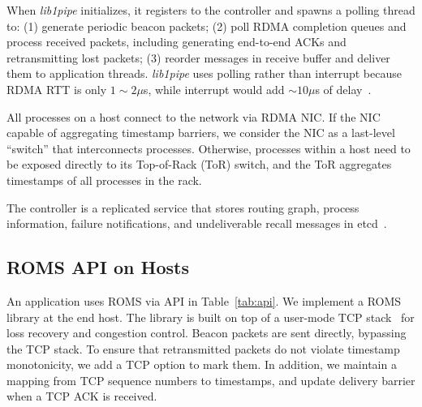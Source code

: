

When \textit{lib1pipe} initializes, it registers to the controller and spawns a polling thread to: (1) generate periodic beacon packets; (2) poll RDMA completion queues and process received packets, including generating end-to-end ACKs and retransmitting lost packets; (3) reorder messages in receive buffer and deliver them to application threads.
\textit{lib1pipe} uses polling rather than interrupt because RDMA RTT is only $1\sim2 \mu$s, while interrupt would add $\sim10 \mu$s of delay~\cite{yang2012poll}.

All processes on a host connect to the network via RDMA NIC. If the NIC capable of aggregating timestamp barriers, we consider the NIC as a last-level ``switch'' that interconnects processes. Otherwise, processes within a host need to be exposed directly to its Top-of-Rack (ToR) switch, and the ToR aggregates timestamps of all processes in the rack.

The controller is a replicated service that stores routing graph, process information, failure notifications, and undeliverable recall messages in etcd~\cite{etcd}.




\iffalse
\subsection{ROMS API on Hosts}
\label{sec:api}

An application uses ROMS via API in Table~\ref{tab:api}.
We implement a ROMS library at the end host. The library is built on top of a user-mode TCP stack~\cite{libvma,dunkels2001design} for loss recovery and congestion control. Beacon packets are sent directly, bypassing the TCP stack. To ensure that retransmitted packets do not violate timestamp monotonicity, we add a TCP option to mark them. In addition, we maintain a mapping from TCP sequence numbers to timestamps, and update delivery barrier when a TCP ACK is received.


